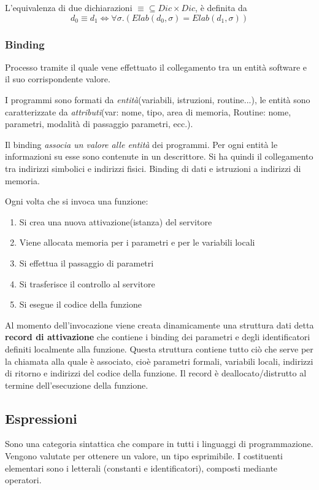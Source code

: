\documentclass[a4paper, 10pt]{article}
\begin{document}
	L'equivalenza di due dichiarazioni $\equiv \subseteq Dic \times Dic$, è definita da $$d_0 \equiv d_1 \iff \forall \sigma.(Elab(d_0,\sigma) = Elab(d_1, \sigma))$$
	
	\subsubsection{Binding}
	Processo tramite il quale vene effettuato il collegamento tra un entità software e il suo corrispondente valore.
	
	I programmi sono formati da \textit{entità}(variabili, istruzioni, routine...), le entità sono caratterizzate da \textit{attributi}(var: nome, tipo, area di memoria, Routine: nome, parametri, modalità di passaggio parametri, ecc.).
	
	Il binding \textit{associa un valore alle entità} dei programmi. Per ogni entità le informazioni su esse sono contenute in un descrittore. Si ha quindi il collegamento tra indirizzi simbolici e indirizzi fisici.
	Binding di dati e istruzioni a indirizzi di memoria.
	
	\noindent
	Ogni volta che si invoca una funzione:
	\begin{enumerate}
		\item Si crea una nuova attivazione(istanza) del servitore
		\item Viene allocata memoria per i parametri e per le variabili locali
		\item Si effettua il passaggio di parametri
		\item Si trasferisce il controllo al servitore
		\item Si esegue il codice della funzione
	\end{enumerate}
	Al momento dell'invocazione viene creata dinamicamente una struttura dati detta \textbf{record di attivazione} che contiene i binding dei parametri e degli identificatori definiti localmente alla funzione. Questa struttura contiene tutto ciò che serve per la chiamata alla quale è associato, cioè parametri formali, variabili locali, indirizzi di ritorno e indirizzi del codice della funzione.
	Il record è deallocato/distrutto al termine dell'esecuzione della funzione.
	
	\subsection{Espressioni}
	Sono una categoria sintattica che compare in tutti i linguaggi di programmazione. Vengono valutate per ottenere un valore, un tipo esprimibile. I costituenti elementari sono i letterali (constanti e identificatori), composti mediante operatori.
	
\end{document}
